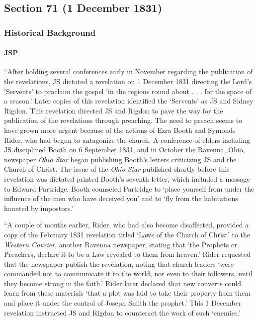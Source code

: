 \subsection{Section 71 (1 December 1831)}
	\label{DC71}
	
	\subsubsection{Historical Background}
		\label{DC71-HB}
		
		\paragraph{JSP}
		
			``After holding several conferences early in November regarding the publication of the revelations, JS dictated a revelation on 1 December 1831 directing the Lord's `Servents' to proclaim the gospel `in the regions round about . . . for the space of a season.' Later copies of this revelation identified the `Servents' as JS and Sidney Rigdon. This revelation directed JS and Rigdon to pave the way for the publication of the revelations through preaching. The need to preach seems to have grown more urgent because of the actions of Ezra Booth and Symonds Rider, who had begun to antagonize the church. A conference of elders including JS disciplined Booth on 6 September 1831, and in October the Ravenna, Ohio, newspaper \textit{Ohio Star} began publishing Booth's letters criticizing JS and the Church of Christ. The issue of the \textit{Ohio Star} published shortly before this revelation was dictated printed Booth's seventh letter, which included a message to Edward Partridge. Booth counseled Partridge to `place yourself from under the influence of the men who have deceived you' and to `fly from the habitations haunted by impostors.'
			
			``A couple of months earlier, Rider, who had also become disaffected, provided a copy of the February 1831 revelation titled `Laws of the Church of Christ' to the \textit{Western Courier}, another Ravenna newspaper, stating that `the Prophets or Preachers, declare it to be a Law revealed to them from heaven.' Rider requested that the newspaper publish the revelation, noting that church leaders `were commanded not to communicate it to the world, nor even to their followers, until they become strong in the faith.' Rider later declared that new converts could learn from these materials `that a plot was laid to take their property from them and place it under the control of Joseph Smith the prophet.' This 1 December revelation instructed JS and Rigdon to counteract the work of such `enemies.'
			
